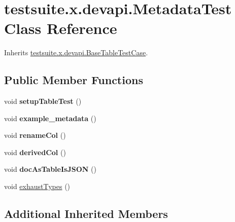 \hypertarget{classtestsuite_1_1x_1_1devapi_1_1_metadata_test}{}\section{testsuite.\+x.\+devapi.\+Metadata\+Test Class Reference}
\label{classtestsuite_1_1x_1_1devapi_1_1_metadata_test}


Inherits \mbox{\hyperlink{classtestsuite_1_1x_1_1devapi_1_1_base_table_test_case}{testsuite.\+x.\+devapi.\+Base\+Table\+Test\+Case}}.

\subsection*{Public Member Functions}
\begin{DoxyCompactItemize}
\item 
\mbox{\label{classtestsuite_1_1x_1_1devapi_1_1_metadata_test_aa25935980cc3f97ca8c9ca4fd31a615d}} 
void {\bfseries setup\+Table\+Test} ()
\item 
\mbox{\label{classtestsuite_1_1x_1_1devapi_1_1_metadata_test_a2a3ac234f8781bff96dcf4509fd50e8b}} 
void {\bfseries example\+\_\+metadata} ()
\item 
\mbox{\label{classtestsuite_1_1x_1_1devapi_1_1_metadata_test_a63df98020bbc9bb39c55754d5607b531}} 
void {\bfseries rename\+Col} ()
\item 
\mbox{\label{classtestsuite_1_1x_1_1devapi_1_1_metadata_test_a932055ae5a58f54957748608955aab13}} 
void {\bfseries derived\+Col} ()
\item 
\mbox{\label{classtestsuite_1_1x_1_1devapi_1_1_metadata_test_a8f79f58540380c4392ab69cbc4abb8eb}} 
void {\bfseries doc\+As\+Table\+Is\+J\+S\+ON} ()
\item 
void \mbox{\hyperlink{classtestsuite_1_1x_1_1devapi_1_1_metadata_test_a34826b6e8607c943adb6d708eb52fb8a}{exhaust\+Types}} ()
\end{DoxyCompactItemize}
\subsection*{Additional Inherited Members}



